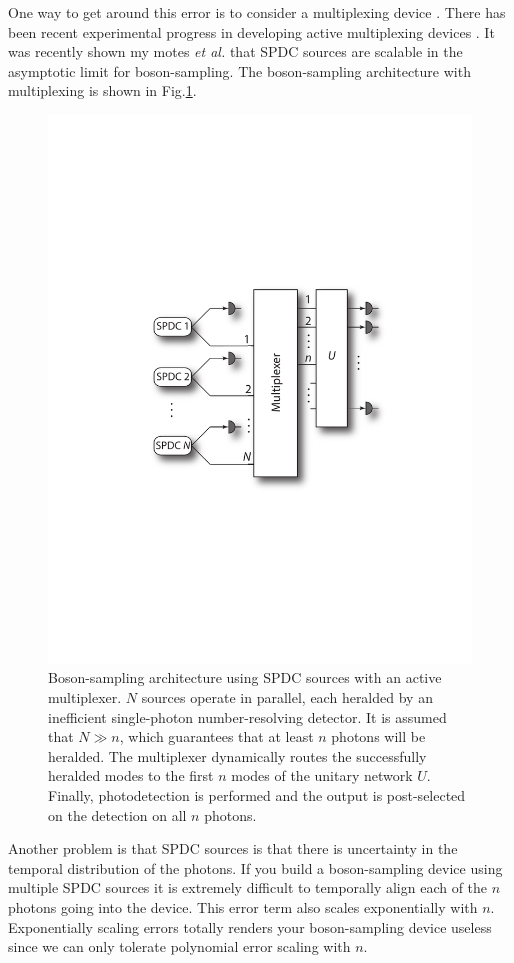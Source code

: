 \documentclass[aps,pra,twocolumn,amsmath,amssymb,nofootinbib,superscriptaddress]{revtex4}
\begin{document}
One way to get around this error is to consider a multiplexing device \cite{bib:migdall2002tailoring}. There has been recent experimental progress in developing active multiplexing devices \cite{bib:LPOR201400027, bib:ma2011experimental}. It was recently shown my motes \emph{et al.} that SPDC sources are scalable in the asymptotic limit for boson-sampling\cite{bib:motes2013spontaneous}. The boson-sampling architecture with multiplexing is shown in Fig.\ref{fig:multiplexing}. 

\begin{figure}[!htb]
\includegraphics[width=0.7\columnwidth]{multiplexing}
\caption{Boson-sampling architecture using SPDC sources with an active multiplexer. $N$ sources operate in parallel, each heralded by an inefficient single-photon number-resolving detector. It is assumed that \mbox{$N\gg n$}, which guarantees that at least $n$ photons will be heralded. The multiplexer dynamically routes the successfully heralded modes to the first $n$ modes of the unitary network $U$. Finally, photodetection is performed and the output is post-selected on the detection on all $n$ photons.}
\label{fig:multiplexing}
\end{figure}

Another problem is that SPDC sources is that there is uncertainty in the temporal distribution of the photons. If you build a boson-sampling device using multiple SPDC sources it is extremely difficult to temporally align each of the $n$ photons going into the device. This error term also scales exponentially with $n$. Exponentially scaling errors totally renders your boson-sampling device useless since we can only tolerate polynomial error scaling with $n$. 
\end{document}
